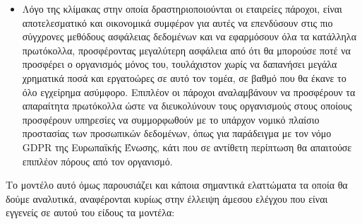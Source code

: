 \documentclass{article}
\begin{document}
\begin{itemize}
\item Λόγο της κλίμακας στην οποία δραστηριοποιούνται οι εταιρείες πάροχοι, είναι αποτελεσματικό και οικονομικά συμφέρον για αυτές να επενδύσουν στις πιο σύγχρονες μεθόδους ασφάλειας δεδομένων και να εφαρμόσουν όλα τα κατάλληλα πρωτόκολλα, προσφέροντας μεγαλύτερη ασφάλεια από ότι θα μπορούσε ποτέ να προσφέρει ο οργανισμός μόνος του, τουλάχιστον χωρίς να δαπανήσει μεγάλα χρηματικά ποσά και εργατοώρες σε αυτό τον τομέα, σε βαθμό που θα έκανε το όλο εγχείρημα ασύμφορο. Επιπλέον οι πάροχοι αναλαμβάνουν να προσφέρουν τα απαραίτητα πρωτόκολλα ώστε να διευκολύνουν τους οργανισμούς στους οποίους προσφέρουν υπηρεσίες να συμμορφωθούν με το υπάρχον νομικό πλαίσιο προστασίας των προσωπικών δεδομένων, όπως για παράδειγμα με τον νόμο GDPR της Ευρωπαϊκής Ένωσης, κάτι που σε αντίθετη περίπτωση θα απαιτούσε επιπλέον πόρους από τον οργανισμό.
\end{itemize}
Το μοντέλο αυτό όμως παρουσιάζει και κάποια σημαντικά ελαττώματα τα οποία θα δούμε αναλυτικά, αναφέρονται κυρίως στην έλλειψη άμεσου ελέγχου που είναι εγγενείς σε αυτού του είδους τα μοντέλα:
\end{document}
